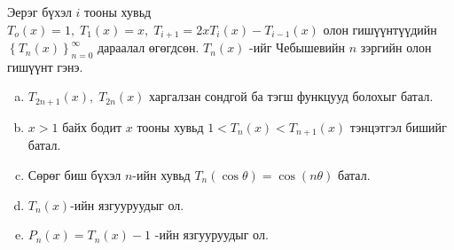 \documentclass[10pt,a4paper,oneside]{book}
\begin{document}
\Problem
Эерэг бүхэл $i$ тооны хувьд $T_o(x) = 1, \; T_1(x) = x, \; T_{i+1} = 2xT_i(x) - T_{i-1}(x)$ олон гишүүнтүүдийн $\left\lbrace T_n(x)\right\rbrace^\infty_{n=0}$ дараалал өгөгдсөн. $T_n(x)$ -ийг Чебышевийн $n$ зэргийн олон гишүүнт гэнэ.
\begin{enumerate}[(a)]
\item
$T_{2n+1}(x), \; T_{2n}(x)$  харгалзан сондгой ба тэгш функцууд болохыг батал.

\item
$x>1$ байх бодит $x$ тооны хувьд $1<T_n(x)<T_{n+1}(x)$ тэнцэтгэл бишийг батал.

\item
Сөрөг биш бүхэл $n$-ийн хувьд $T_n(\cos \theta) = \cos (n\theta)$ батал.

\item
$T_n(x)$-ийн язгууруудыг ол.

\item
$P_n(x) = T_n(x) -1$ -ийн язгууруудыг ол.

\end{enumerate}
\end{document}
